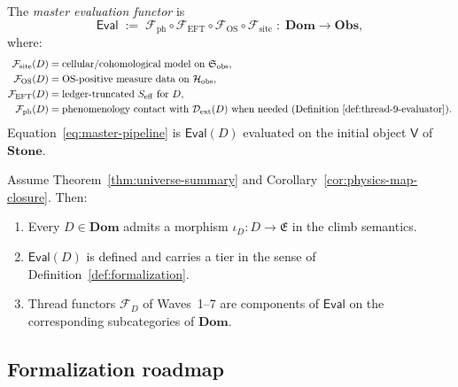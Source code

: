 \begin{definition}\label{def:eval-functor}
The \emph{master evaluation functor} is
\begin{equation}\label{eq:formal-eval}
  \mathsf{Eval}
  \;:=\;
  \mathcal{F}_{\mathrm{ph}}\circ\mathcal{F}_{\mathrm{EFT}}\circ
  \mathcal{F}_{\mathrm{OS}}\circ\mathcal{F}_{\mathrm{site}}
  \;:\;
  \mathbf{Dom}\longrightarrow\mathbf{Obs},
\end{equation}
where:
\begin{align*}
  \mathcal{F}_{\mathrm{site}}(D)
  &= \text{cellular/cohomological model on }\mathfrak{S}_{\mathrm{obs}},\\
  \mathcal{F}_{\mathrm{OS}}(D)
  &= \text{OS-positive measure data on }\mathcal{H}_{\mathrm{obs}},\\
  \mathcal{F}_{\mathrm{EFT}}(D)
  &= \text{ledger-truncated }S_{\mathrm{eff}}\text{ for }D,\\
  \mathcal{F}_{\mathrm{ph}}(D)
  &= \text{phenomenology contact with }\mathcal{D}_{\mathrm{ext}}(D)
    \text{ when needed (Definition~\ref{def:thread-9-evaluator})}.
\end{align*}
Equation~\eqref{eq:master-pipeline} is $\mathsf{Eval}(D)$ evaluated on the
initial object $\mathsf{V}$ of $\mathbf{Stone}$.
\end{definition}

\begin{theorem}
\label{thm:formal-physics-map}
Assume Theorem~\ref{thm:universe-summary} and
Corollary~\ref{cor:physics-map-closure}. Then:
\begin{enumerate}[label=(\roman*),leftmargin=*]
  \item Every $D\in\mathbf{Dom}$ admits a morphism
    $\iota_D:D\to\mathfrak{E}$ in the climb semantics.
  \item $\mathsf{Eval}(D)$ is defined and carries a tier in the sense of
    Definition~\ref{def:formalization}.
  \item Thread functors $\mathcal{F}_D$ of Waves~1--7 are components of
    $\mathsf{Eval}$ on the corresponding subcategories of $\mathbf{Dom}$.
\end{enumerate}
\end{theorem}

\subsection{Formalization roadmap}
\label{sec:formal-foundations:roadmap}

